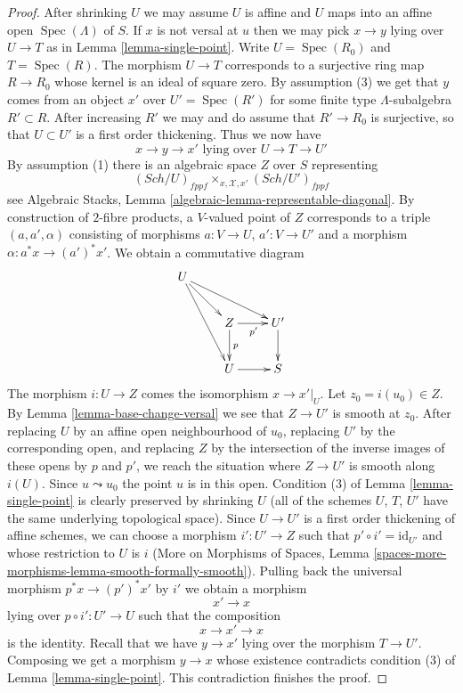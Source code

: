 \documentclass{stacks-project}
\theoremstyle{plain}
\theoremstyle{definition}
\theoremstyle{remark}
\numberwithin{equation}{subsection}
\def\Spec{\mathop{\mathrm{Spec}}}
\def\Sch{\mathit{Sch}}
\begin{document}
\begin{proof}
After shrinking $U$ we may assume $U$ is affine and $U$ maps into an
affine open $\Spec(\Lambda)$ of $S$. If $x$ is not versal at $u$ then
we may pick $x \to y$ lying over $U \to T$ as in
Lemma \ref{lemma-single-point}. Write $U = \Spec(R_0)$ and $T = \Spec(R)$.
The morphism $U \to T$ corresponds to a surjective ring map
$R \to R_0$ whose kernel is an ideal of square zero.
By assumption (3) we get that $y$ comes from an object $x'$ over
$U' = \Spec(R')$ for some finite type $\Lambda$-subalgebra
$R' \subset R$. After increasing $R'$ we may and do assume that
$R' \to R_0$ is surjective, so that $U \subset U'$ is a first order thickening.
Thus we now have
$$
x \to y \to x'
\text{ lying over }
U \to T \to U'
$$
By assumption (1) there is an algebraic space $Z$ over $S$ representing
$$
(\Sch/U)_{fppf} \times_{x, \mathcal{X}, x'} (\Sch/U')_{fppf}
$$
see Algebraic Stacks, Lemma \ref{algebraic-lemma-representable-diagonal}.
By construction of $2$-fibre products, a $V$-valued point of $Z$
corresponds to a triple $(a, a', \alpha)$ consisting of morphisms
$a : V \to U$, $a' : V \to U'$ and a morphism $\alpha : a^*x \to (a')^*x'$.
We obtain a commutative diagram
$$
\xymatrix{
U \ar[rd] \ar[rdd] \ar[rrd] \\
& Z \ar[r]_{p'} \ar[d]^p & U' \ar[d] \\
& U \ar[r] & S
}
$$
The morphism $i : U \to Z$ comes the isomorphism $x \to x'|_U$.
Let $z_0 = i(u_0) \in Z$. By Lemma \ref{lemma-base-change-versal}
we see that $Z \to U'$ is smooth at $z_0$. After replacing $U$ by an
affine open neighbourhood of $u_0$, replacing $U'$ by the corresponding
open, and replacing $Z$ by the intersection of the inverse images
of these opens by $p$ and $p'$, we reach the situation where
$Z \to U'$ is smooth along $i(U)$. Since $u \leadsto u_0$ the point
$u$ is in this open. Condition (3) of Lemma \ref{lemma-single-point}
is clearly preserved by shrinking $U$ (all of the schemes $U$, $T$, $U'$
have the same underlying topological space).
Since $U \to U'$ is a first order thickening of affine schemes,
we can choose a morphism $i' : U' \to Z$
such that $p' \circ i' = \text{id}_{U'}$ and
whose restriction to $U$ is $i$
(More on Morphisms of Spaces, Lemma
\ref{spaces-more-morphisms-lemma-smooth-formally-smooth}).
Pulling back the universal morphism $p^*x \to (p')^*x'$ by $i'$
we obtain a morphism
$$
x' \to x
$$
lying over $p \circ i' : U' \to U$ such that the composition
$$
x \to x' \to x
$$
is the identity. Recall that we have $y \to x'$ lying over
the morphism $T \to U'$. Composing we get a morphism
$y \to x$ whose existence contradicts condition
(3) of Lemma \ref{lemma-single-point}.
This contradiction finishes the proof.
\end{proof}
\end{document}

